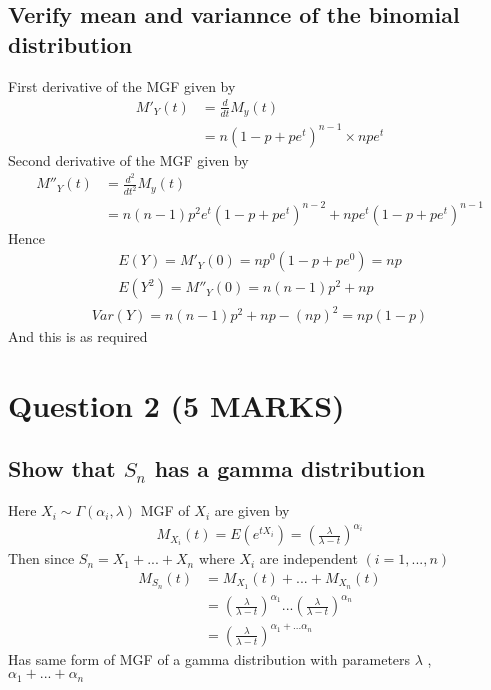 \documentclass[11pt]{article}
\begin{document}
\subsection{Verify mean and variannce of the binomial distribution}
First derivative of the MGF given by
\begin{align*}
  M'_{Y}(t) &= \frac{d}{dt}M_{y}(t)  \\
            &= n(1-p+pe^{t})^{n-1} \times npe^{t}
\end{align*}
Second derivative of the MGF given by
\begin{align*}
  M''_{Y}(t) &= \frac{d^{2}}{dt^{2}}M_{y}(t) \\
             &= n(n-1)p^{2}e^{t}(1-p+pe^{t})^{n-2} + npe^{t}(1-p+pe^{t})^{n-1}
\end{align*}
Hence
\begin{align*}
  \boxed{E(Y)=  M'_{Y}(0) = np^{0}(1-p+pe^{0}) = np} \\
  E(Y^{2}) = M''_{Y}(0) = n(n-1)p^{2}+np
\end{align*}
\begin{align*}
  \boxed{Var(Y)= n(n-1)p^{2}+np - (np)^{2} = np(1-p)}
\end{align*}
And this is as required
\section{Question 2 (5 MARKS)}
\subsection{Show that $S_{n}$ has a gamma distribution}
Here $X_{i} \sim \Gamma(\alpha_{i},\lambda)$ MGF of $X_{i}$ are given by
\begin{align*}
  M_{X_{i}}(t) = E(e^{tX_{i}}) = \left(\frac{\lambda}{\lambda -t} \right )^{\alpha_{i}}
\end{align*}
Then since $S_{n} = X_{1} + ... + X_{n}$ where $X_{i}$ are independent $(i=1,...,n)$
\begin{align*}
  M_{S_{n}} (t) &= M_{X_{1}}(t) + ... + M_{X_{n}}(t) \\
            &= \left(\frac{\lambda}{\lambda -t} \right )^{\alpha_{1}} ... \left(\frac{\lambda}{\lambda -t} \right )^{\alpha_{n}} \\
            &= \left(\frac{\lambda}{\lambda -t} \right )^{\alpha_{1}+...\alpha_{n}}
\end{align*}
Has same form of MGF of a gamma distribution with parameters $\lambda$ , $\alpha_{1} + ... + \alpha_{n}$
\end{document}
